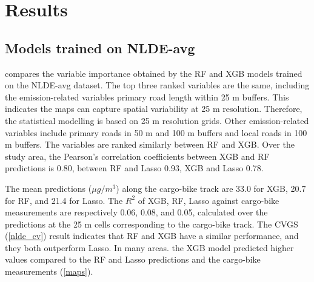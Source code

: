 \documentclass{article}
\begin{document}

\section{Results}
\subsection{Models trained on NLDE-avg}

 compares the variable importance obtained by the RF and XGB models trained on the NLDE-avg dataset. The top three ranked variables are the same, including the emission-related variables primary road length within 25 m buffers. This indicates the maps can capture spatial variability at 25 m resolution. Therefore, the statistical modelling is based on 25 m resolution grids. Other emission-related variables include primary roads in 50 m and 100 m buffers and local roads in 100 m buffers. The variables are ranked similarly between RF and XGB. 
Over the study area, the Pearson's correlation coefficients between XGB and RF predictions is 0.80, between RF and Lasso 0.93, XGB and Lasso 0.78.

The mean predictions ($\mu g/m^3$) along the cargo-bike track are 33.0 for XGB, 20.7 for RF, and 21.4 for Lasso.  The $R^2$ of XGB, RF, Lasso against cargo-bike measurements are respectively 0.06, 0.08, and 0.05, calculated over the predictions at the 25 m cells corresponding to the cargo-bike track. The CVGS (\cref{nlde_cv}) result indicates that RF and XGB have a similar performance, and they both outperform Lasso. In many areas. the XGB model predicted higher values compared to the RF and Lasso predictions and the cargo-bike measurements (\cref{maps}). 
 
\end{document}
